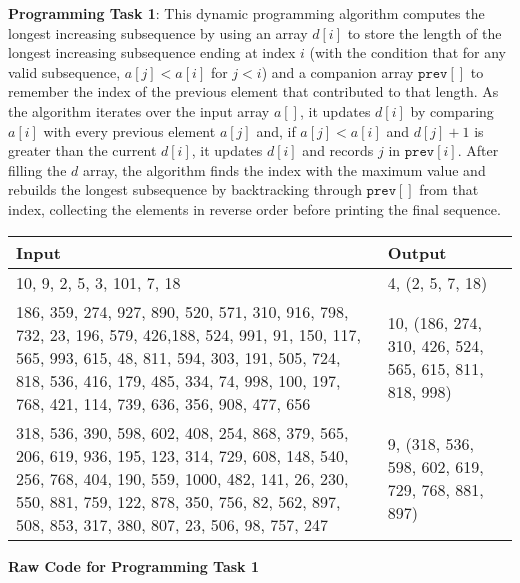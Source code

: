 \documentclass[12pt,letterpaper,final]{report}
\begin{document}
\pagebreak
\textbf{Programming Task 1}: This dynamic programming algorithm computes the longest increasing subsequence by using an array \(d[i]\) to store the length of the longest increasing subsequence ending at index \(i\) (with the condition that for any valid subsequence, \(a[j] < a[i]\) for \(j < i\)) and a companion array \(\texttt{prev}[]\) to remember the index of the previous element that contributed to that length. As the algorithm iterates over the input array \(a[]\), it updates \(d[i]\) by comparing \(a[i]\) with every previous element \(a[j]\) and, if \(a[j] < a[i]\) and \(d[j] + 1\) is greater than the current \(d[i]\), it updates \(d[i]\) and records \(j\) in \(\texttt{prev}[i]\). After filling the \(d\) array, the algorithm finds the index with the maximum value and rebuilds the longest subsequence by backtracking through \(\texttt{prev}[]\) from that index, collecting the elements in reverse order before printing the final sequence.

\begin{center}
\begin{tabular}{ | m{25em} | m{10em}| } 
  \hline
        \textbf{Input} & \textbf{Output}\\ 
  \hline
        10, 9, 2, 5, 3, 101, 7, 18 & 4, (2, 5, 7, 18)\\
    \hline 
        186, 359, 274, 927, 890, 520, 571, 310, 916, 798, 732, 23, 196, 579, 426,188, 524, 991, 91, 150, 117, 565, 993, 615, 48, 811, 594, 303, 191, 505, 724, 818, 536, 416, 179, 485, 334, 74, 998, 100, 197, 768, 421, 114, 739, 636, 356, 908, 477, 656 & 10, (186, 274, 310, 426, 524, 565, 615, 811, 818, 998)\\
    \hline
        318, 536, 390, 598, 602, 408, 254, 868, 379, 565, 206, 619, 936, 195, 123, 314, 729, 608, 148, 540, 256, 768, 404, 190, 559, 1000, 482, 141, 26, 230, 550, 881, 759, 122, 878, 350, 756, 82, 562, 897, 508, 853, 317, 380, 807, 23, 506, 98, 757, 247 & 9, (318, 536, 598, 602, 619, 729, 768, 881, 897)\\
    \hline
\end{tabular}
\end{center}

\pagebreak



\textbf{Raw Code for Programming Task 1}

\lstset{
    basicstyle=\ttfamily\footnotesize,
    breaklines=true,  %
    frame=single,     %
    tabsize=4,        %
    showstringspaces=false %
}
\end{document}

